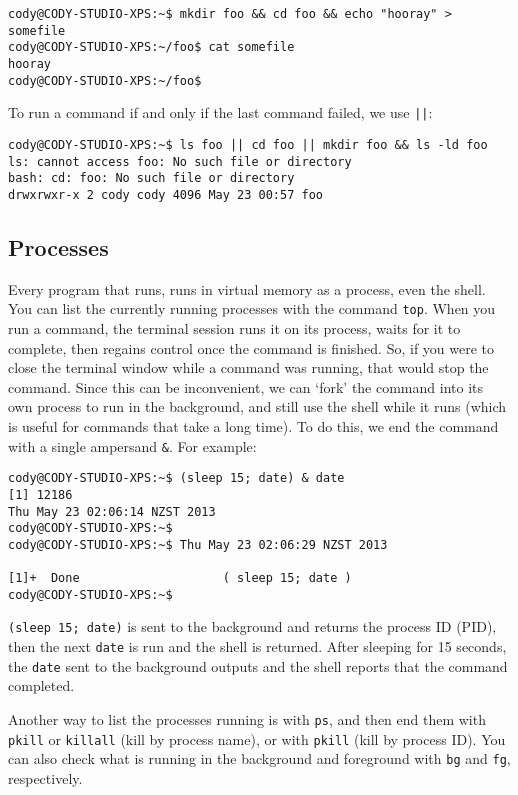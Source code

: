 \documentclass{article}
\begin{document}
\begin{verbatim}
cody@CODY-STUDIO-XPS:~$ mkdir foo && cd foo && echo "hooray" > somefile
cody@CODY-STUDIO-XPS:~/foo$ cat somefile 
hooray
cody@CODY-STUDIO-XPS:~/foo$
\end{verbatim}
To run a command if and only if the last command failed, we use \texttt{||}:

\begin{verbatim}
cody@CODY-STUDIO-XPS:~$ ls foo || cd foo || mkdir foo && ls -ld foo
ls: cannot access foo: No such file or directory
bash: cd: foo: No such file or directory
drwxrwxr-x 2 cody cody 4096 May 23 00:57 foo
\end{verbatim}

\subsection{Processes}
Every program that runs, runs in virtual memory as a process, even the shell. You can list the currently running processes with the command \texttt{top}.
When you run a command, the terminal session runs it on its process, waits for it to complete, then regains control once the command is finished. So, if you were to close the terminal window while a command was running, that would stop the command. Since this can be inconvenient, we can `fork' the command into its own process to run in the background, and still use the shell while it runs (which is useful for commands that take a long time). To do this, we end the command with a single ampersand \texttt{\&}. For example:

\begin{verbatim}
cody@CODY-STUDIO-XPS:~$ (sleep 15; date) & date 
[1] 12186
Thu May 23 02:06:14 NZST 2013
cody@CODY-STUDIO-XPS:~$ 
cody@CODY-STUDIO-XPS:~$ Thu May 23 02:06:29 NZST 2013

[1]+  Done                    ( sleep 15; date )
cody@CODY-STUDIO-XPS:~$ 
\end{verbatim}
\texttt{(sleep 15; date)} is sent to the background and returns the process ID (PID), then the next \texttt{date} is run and the shell is returned. After sleeping for 15 seconds, the \texttt{date} sent to the background outputs and  the shell reports that the command completed.

Another way to list the processes running is with \texttt{ps}, and then end them with \texttt{pkill} or \texttt{killall} (kill by process name), or with \texttt{pkill} (kill by process ID). You can also check what is running in the background and foreground with \texttt{bg} and \texttt{fg}, respectively.
 
\end{document}
